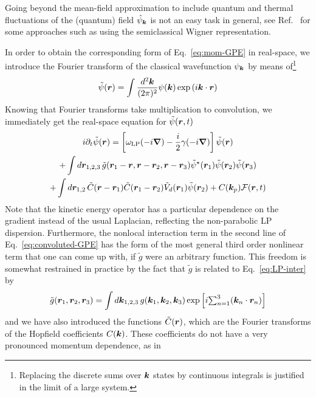 Going beyond the mean-field approximation to include quantum and
thermal fluctuations of the (quantum) field $\hat{\psi}_{\bm{k}}$ is not
an easy task in general, see Ref.~\cite{Carusotto_2013} for some
approaches such as using the semiclassical Wigner representation.


In order to obtain the corresponding form of Eq.~\eqref{eq:mom-GPE} in
real-space, we introduce the Fourier transform of the classical
wavefunction $\psi_{\bm{k}}$ by means of\footnote{Replacing the discrete
  sums over $\bm{k}$ states by continuous integrals is justified in the
  limit of a large system.}
%
\begin{equation}\label{eq:fourier-psi}
  \tilde{\psi}(\bm{r}) = \int \frac{d^2\bm{k}}{(2\pi)^2} \psi(\bm{k}) \exp \left(i \bm{k} \cdot\bm{r} \right)
\end{equation}
% 
Knowing that Fourier transforms take multiplication to convolution, we
immediately get the real-space equation for $\tilde{\psi}(\bm{r}, t)$
\begin{multline}\label{eq:convoluted-GPE}
  i \partial_t \tilde{\psi}(\bm{r}) = \left[ \omega_{\text{LP}}(-i \bm{\nabla}) - \frac{i}{2} \gamma(-i \bm{\nabla}) \right] \tilde{\psi}(\bm{r})\\ + \int d\bm{r}_{1,2,3} \,\tilde{g}(\bm{r}_1 - \bm{r}, \bm{r} - \bm{r}_2, \bm{r} - \bm{r}_3) \tilde{\psi}^{\star}(\bm{r}_1) \tilde{\psi}(\bm{r}_2) \tilde{\psi}(\bm{r}_3)\\
+ \int d\bm{r}_{1,2} \,\tilde{C}(\bm{r} - \bm{r}_1) \tilde{C}(\bm{r}_1 - \bm{r}_2) \tilde{V}_d(\bm{r}_1) \tilde{\psi}(\bm{r}_2) + C(\bm{k}_p) \mathcal{F}(\bm{r},t)
\end{multline}
Note that the kinetic energy operator has a particular dependence on
the gradient instead of the usual Laplacian, reflecting the
non-parabolic LP dispersion.  Furthermore, the nonlocal interaction
term in the second line of Eq.~\eqref{eq:convoluted-GPE} has the form
of the most general third order nonlinear term that one can come up
with, if $\tilde{g}$ were an arbitrary function. This freedom is
somewhat restrained in practice by the fact that $\tilde{g}$ is related to
Eq.~\eqref{eq:LP-inter} by
%
\begin{equation}\label{eq:convoluted-g}
  \tilde{g}(\bm{r}_1, \bm{r}_2, \bm{r}_3) = \int d\bm{k}_{1,2,3} \,g(\bm{k}_1,\bm{k}_2,\bm{k}_3) \exp \left[i \textstyle{\sum_{n=1}^3} (\bm{k}_n \cdot \bm{r}_n) \right]
\end{equation}
% 
and we have also introduced the functions $\tilde{C}(\bm{r})$, which are
the Fourier transforms of the Hopfield coefficients $C(\bm{k})$. These
coefficients do not have a very pronounced momentum dependence, as in
